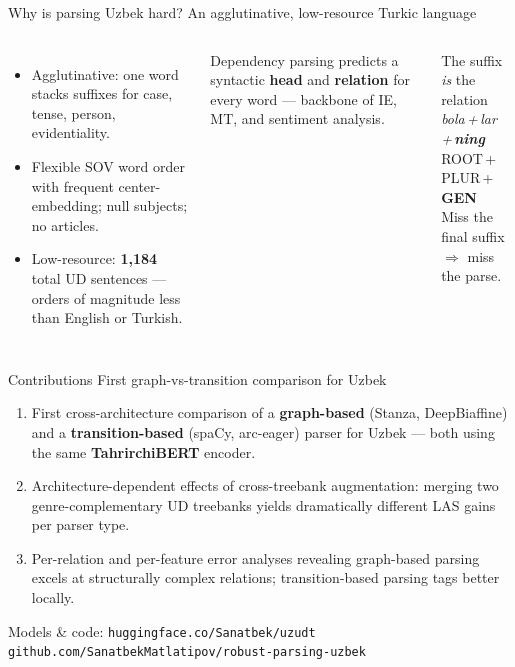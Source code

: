 \documentclass[t,10pt]{beamer}
\newcommand{\best}[1]{\textcolor{edmgreen}{\textbf{#1}}}
\begin{document}
\begin{frame}{Why is parsing Uzbek hard?}%
             {An agglutinative, low-resource Turkic language}
  \begin{columns}[onlytextwidth]
      \begin{itemize}
        \item \alert{Agglutinative}: one word stacks suffixes for
              case, tense, person, evidentiality.
        \item \alert{Flexible SOV} word order with frequent
              center-embedding; null subjects; no articles.
        \item \alert{Low-resource}: \best{1{,}184} total UD sentences
              --- orders of magnitude less than English or Turkish.
      \end{itemize}
      \medskip
      \footnotesize Dependency parsing predicts a syntactic
      \textbf{head} and \textbf{relation} for every word ---
      backbone of IE, MT, and sentiment analysis.
      \begin{block}{The suffix \emph{is} the relation}
        \centering
        \textit{bola\,+\,lar\,+\,\best{ning}}\\[2pt]
        ROOT\,+\,PLUR\,+\,\best{GEN}\\[4pt]
        \footnotesize Miss the final suffix $\Rightarrow$ miss the parse.
      \end{block}
  \end{columns}
\end{frame}

\begin{frame}{Contributions}%
             {First graph-vs-transition comparison for Uzbek}
  \begin{enumerate}
    \item \alert{First cross-architecture comparison} of a
          \textbf{graph-based} (Stanza, DeepBiaffine) and a
          \textbf{transition-based} (spaCy, arc-eager) parser for
          Uzbek --- both using the same \textbf{TahrirchiBERT} encoder.
    \item \alert{Architecture-dependent effects of cross-treebank
          augmentation}: merging two genre-complementary UD treebanks
          yields dramatically different LAS gains per parser type.
    \item \alert{Per-relation and per-feature error analyses}
          revealing graph-based parsing excels at structurally complex
          relations; transition-based parsing tags better locally.
  \end{enumerate}
  \medskip
  \footnotesize
  Models \& code:\;
  \texttt{huggingface.co/Sanatbek/uzudt}\quad
  \texttt{github.com/SanatbekMatlatipov/robust-parsing-uzbek}
\end{frame}
\end{document}
